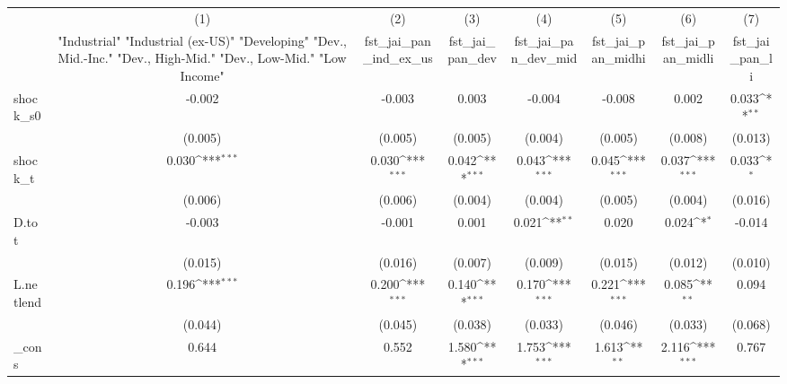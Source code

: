 {
\def\sym#1{\ifmmode^{#1}\else\(^{#1}\)\fi}
\begin{tabular}{l*{7}{c}}
\toprule
            &\multicolumn{1}{c}{(1)}&\multicolumn{1}{c}{(2)}&\multicolumn{1}{c}{(3)}&\multicolumn{1}{c}{(4)}&\multicolumn{1}{c}{(5)}&\multicolumn{1}{c}{(6)}&\multicolumn{1}{c}{(7)}\\
            &\multicolumn{1}{c}{ "Industrial" "Industrial (ex-US)" "Developing" "Dev., Mid.-Inc." "Dev., High-Mid."  "Dev., Low-Mid." "Low Income" }&\multicolumn{1}{c}{fst\_jai\_pan\_ind\_ex\_us}&\multicolumn{1}{c}{fst\_jai\_pan\_dev}&\multicolumn{1}{c}{fst\_jai\_pan\_dev\_mid}&\multicolumn{1}{c}{fst\_jai\_pan\_midhi}&\multicolumn{1}{c}{fst\_jai\_pan\_midli}&\multicolumn{1}{c}{fst\_jai\_pan\_li}\\
\midrule
shock\_s0    &      -0.002         &      -0.003         &       0.003         &      -0.004         &      -0.008         &       0.002         &       0.033\sym{**} \\
            &     (0.005)         &     (0.005)         &     (0.005)         &     (0.004)         &     (0.005)         &     (0.008)         &     (0.013)         \\
\addlinespace
shock\_t     &       0.030\sym{***}&       0.030\sym{***}&       0.042\sym{***}&       0.043\sym{***}&       0.045\sym{***}&       0.037\sym{***}&       0.033\sym{*}  \\
            &     (0.006)         &     (0.006)         &     (0.004)         &     (0.004)         &     (0.005)         &     (0.004)         &     (0.016)         \\
\addlinespace
D.tot       &      -0.003         &      -0.001         &       0.001         &       0.021\sym{**} &       0.020         &       0.024\sym{*}  &      -0.014         \\
            &     (0.015)         &     (0.016)         &     (0.007)         &     (0.009)         &     (0.015)         &     (0.012)         &     (0.010)         \\
\addlinespace
L.netlend   &       0.196\sym{***}&       0.200\sym{***}&       0.140\sym{***}&       0.170\sym{***}&       0.221\sym{***}&       0.085\sym{**} &       0.094         \\
            &     (0.044)         &     (0.045)         &     (0.038)         &     (0.033)         &     (0.046)         &     (0.033)         &     (0.068)         \\
\addlinespace
\_cons      &       0.644         &       0.552         &       1.580\sym{***}&       1.753\sym{***}&       1.613\sym{**} &       2.116\sym{***}&       0.767         \\

\end{tabular}}
